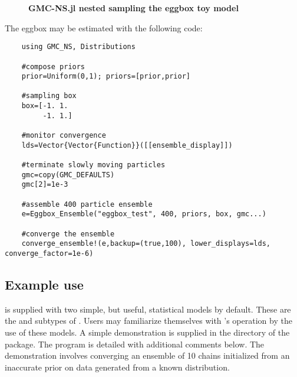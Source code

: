 \begin{figure}[!h]
    \caption{{\bf GMC-NS.jl nested sampling the eggbox toy model}}
    \label{eggboxfig}
\end{figure}

The eggbox may be estimated with the following code:

\begin{verbatim}
    using GMC_NS, Distributions

    #compose priors
    prior=Uniform(0,1); priors=[prior,prior]

    #sampling box
    box=[-1. 1.
         -1. 1.]

    #monitor convergence
    lds=Vector{Vector{Function}}([[ensemble_display]])

    #terminate slowly moving particles
    gmc=copy(GMC_DEFAULTS)
    gmc[2]=1e-3

    #assemble 400 particle ensemble
    e=Eggbox_Ensemble("eggbox_test", 400, priors, box, gmc...)

    #converge the ensemble
    converge_ensemble!(e,backup=(true,100), lower_displays=lds, converge_factor=1e-6)
\end{verbatim}

\subsection{Example use}
 is supplied with two simple, but useful, statistical models by default. These are the  and  subtypes of . Users may familiarize themselves with 's operation by the use of these models. A simple demonstration is supplied in the  directory of the package. The program is detailed with additional comments below. The demonstration involves converging an ensemble of 10  chains initialized from an inaccurate  prior on data generated from a known  distribution.

